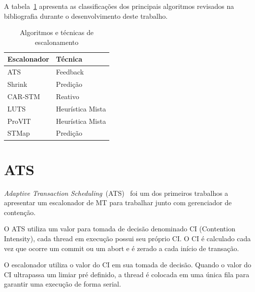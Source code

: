 \documentclass[diss,capa]{texufpel}
\begin{document}

A tabela~\ref{tab:compare} apresenta as classificações dos principais algoritmos revisados na bibliografia durante o desenvolvimento deste trabalho.

\begin{table}[]
\footnotesize
\centering
\caption{Algoritmos e técnicas de escalonamento}
\label{tab:compare}
\begin{tabular}{l|l}
\hline
Escalonador & Técnica \\ \hline
ATS & Feedback \\
Shrink & Predição \\
CAR-STM & Reativo \\
LUTS & Heurística Mista \\
ProVIT & Heurística Mista \\
STMap & Predição \\
\hline
\end{tabular}
\end{table}

\section{ATS}

\emph{Adaptive Transaction Scheduling}~(ATS)~\cite{ats2008} foi um dos primeiros trabalhos a apresentar um escalonador de MT para trabalhar junto com gerenciador de contenção.

O ATS utiliza um valor para tomada de decisão denominado CI (Contention Intensity), cada thread em execução possui seu próprio CI. O CI é calculado cada vez que ocorre um commit ou um abort e é zerado a cada início de transação.

O escalonador utiliza o valor do CI em sua tomada de decisão. Quando o valor do CI ultrapassa um limiar pré definido, a thread é colocada em uma única fila para garantir uma execução de forma serial.
\end{document}
